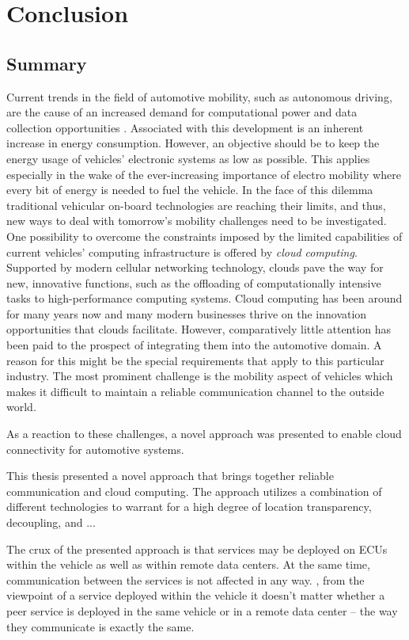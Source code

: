 
\chapter{Conclusion}\label{chapter:conclusion}
\section{Summary}\label{sec:summary}
Current trends in the field of automotive mobility, such as autonomous driving, are the cause of an increased demand for computational power and data collection opportunities . Associated with this development is an inherent increase in energy consumption. However, an objective should be to keep the energy usage of vehicles' electronic systems as low as possible. This applies especially in the wake of the ever-increasing importance of electro mobility where every bit of energy is needed to fuel the vehicle. In the face of this dilemma traditional vehicular on-board technologies are reaching their limits, and thus, new ways to deal with tomorrow's mobility challenges need to be investigated. One possibility to overcome the constraints imposed by the limited capabilities of current vehicles' computing infrastructure is offered by \emph{cloud computing}. Supported by modern cellular networking technology, clouds pave the way for new, innovative functions, such as the offloading of computationally intensive tasks to high-performance computing systems. Cloud computing has been around for many years now and many modern businesses thrive on the innovation opportunities that clouds facilitate. However, comparatively little attention has been paid to the prospect of integrating them into the automotive domain. A reason for this might be the special requirements that apply to this particular industry. The most prominent challenge is the mobility aspect of vehicles which makes it difficult to maintain a reliable communication channel to the outside world. 

As a reaction to these challenges, a novel approach was presented to enable cloud connectivity for automotive systems.

This thesis presented a novel approach that brings together reliable communication and cloud computing. The approach utilizes a combination of different technologies to warrant for a high degree of location transparency, decoupling,  and ...

The crux of the presented approach is that services may be deployed on ECUs within the vehicle as well as within remote data centers. At the same time, communication between the services is not affected in any way. \Ie , from the viewpoint of a service deployed within the vehicle it doesn't matter whether a peer service is deployed in the same vehicle or in a remote data center -- the way they communicate is exactly the same.


